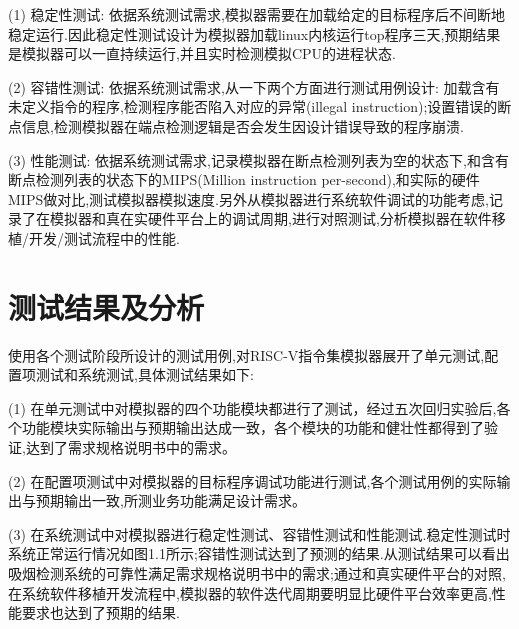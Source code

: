 (1)	稳定性测试: 依据系统测试需求,模拟器需要在加载给定的目标程序后不间断地稳定运行.因此稳定性测试设计为模拟器加载linux内核运行top程序三天,预期结果是模拟器可以一直持续运行,并且实时检测模拟CPU的进程状态.


(2)	容错性测试: 依据系统测试需求,从一下两个方面进行测试用例设计: 加载含有未定义指令的程序,检测程序能否陷入对应的异常(illegal instruction);设置错误的断点信息,检测模拟器在端点检测逻辑是否会发生因设计错误导致的程序崩溃.


(3)	性能测试: 依据系统测试需求,记录模拟器在断点检测列表为空的状态下,和含有断点检测列表的状态下的MIPS(Million instruction per-second),和实际的硬件MIPS做对比,测试模拟器模拟速度.另外从模拟器进行系统软件调试的功能考虑,记录了在模拟器和真在实硬件平台上的调试周期,进行对照测试,分析模拟器在软件移植/开发/测试流程中的性能.

\section{测试结果及分析}
使用各个测试阶段所设计的测试用例,对RISC-V指令集模拟器展开了单元测试,配置项测试和系统测试,具体测试结果如下:


(1) 在单元测试中对模拟器的四个功能模块都进行了测试，经过五次回归实验后,各个功能模块实际输出与预期输出达成一致，各个模块的功能和健壮性都得到了验证,达到了需求规格说明书中的需求。


(2) 在配置项测试中对模拟器的目标程序调试功能进行测试,各个测试用例的实际输出与预期输出一致,所测业务功能满足设计需求。


(3) 在系统测试中对模拟器进行稳定性测试、容错性测试和性能测试.稳定性测试时系统正常运行情况如图1.1所示;容错性测试达到了预测的结果.从测试结果可以看出吸烟检测系统的可靠性满足需求规格说明书中的需求;通过和真实硬件平台的对照,在系统软件移植开发流程中,模拟器的软件迭代周期要明显比硬件平台效率更高,性能要求也达到了预期的结果. 
